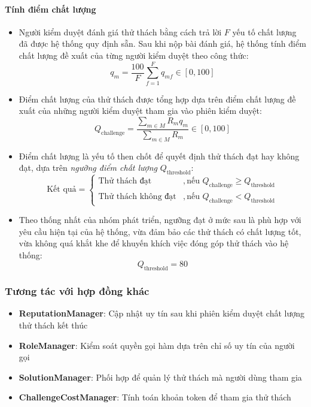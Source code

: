 \paragraph{Tính điểm chất lượng}
\begin{itemize}
  \item Người kiểm duyệt đánh giá thử thách bằng cách trả lời $F$ yếu tố chất lượng đã được hệ thống quy định sẵn. Sau khi nộp bài đánh giá, hệ thống tính điểm chất lượng đề xuất của từng người kiểm duyệt theo công thức:
        \[q_m=\frac{100}{F} \sum_{f=1}^{F} q_{mf} \in[0,100]\]
  \item Điểm chất lượng của thử thách được tổng hợp dựa trên điểm chất lượng đề xuất của những người kiểm duyệt tham gia vào phiên kiểm duyệt:
        \[Q_{\text{challenge}}=\frac{\displaystyle\sum_{m \in M} R_m q_m}{\displaystyle\sum_{m \in M}R_m} \in[0,100]\]
  \item Điểm chất lượng là yếu tố then chốt để quyết định thử thách đạt hay không đạt, dựa trên \textit{ngưỡng điểm chất lượng} $Q_{\text{threshold}}$:
        \[
          \text{Kết quả} =
          \begin{cases}
            \text{Thử thách đạt}       & , \text{nếu } Q_{\text{challenge}} \geq Q_{\text{threshold}} \\
            \text{Thử thách không đạt} & , \text{nếu } Q_{\text{challenge}} < Q_{\text{threshold}}
          \end{cases}
        \]
  \item Theo thống nhất của nhóm phát triển, ngưỡng đạt ở mức sau là phù hợp với yêu cầu hiện tại của hệ thống, vừa đảm bảo các thử thách có chất lượng tốt, vừa không quá khắt khe để khuyến khích việc đóng góp thử thách vào hệ thống:
        \[Q_{\text{threshold}} = 80 \]

\end{itemize}


\subsubsection{Tương tác với hợp đồng khác}

\begin{itemize}
  \item \textbf{ReputationManager}: Cập nhật uy tín sau khi phiên kiểm duyệt chất lượng thử thách kết thúc
  \item \textbf{RoleManager}: Kiểm soát quyền gọi hàm dựa trên chỉ số uy tín của người gọi
  \item \textbf{SolutionManager}: Phối hợp để quản lý thử thách mà người dùng tham gia
  \item \textbf{ChallengeCostManager}: Tính toán khoản token để tham gia thử thách
\end{itemize}

